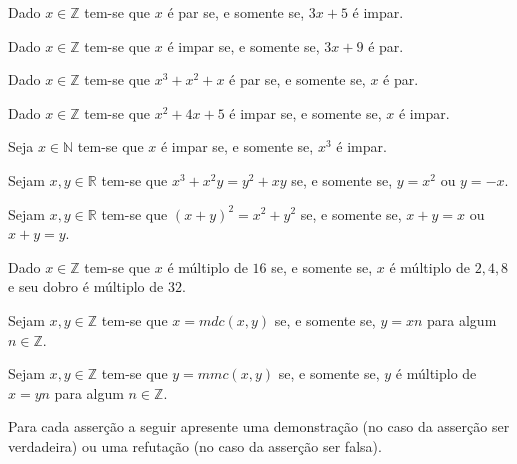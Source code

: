 \begin{exerList}
	\item Dado $x \in \mathbb{Z}$ tem-se que $x$ é par se, e somente se, $3x + 5$ é impar.
	\item Dado $x \in \mathbb{Z}$ tem-se que $x$ é impar se, e somente se, $3x + 9$ é par.
	\item Dado $x \in \mathbb{Z}$ tem-se que $x^3 + x^2 + x$ é par se, e somente se, $x$ é par.
	\item Dado $x \in \mathbb{Z}$ tem-se que $x^2 + 4x + 5$ é impar se, e somente se, $x$ é impar.
	\item Seja $x \in \mathbb{N}$ tem-se que $x$ é impar se, e somente se, $x^3$ é impar.
	\item Sejam $x, y \in \mathbb{R}$ tem-se que $x^3 + x^2y = y^2 + xy$ se, e somente se, $y = x^2$ ou $y = -x$.
	\item Sejam $x, y \in \mathbb{R}$ tem-se que $(x + y)^2 = x^2 + y^2$ se, e somente se, $x + y = x$ ou $x + y = y$.
	\item Dado $x \in \mathbb{Z}$ tem-se que $x$ é múltiplo de $16$ se, e somente se, $x$ é múltiplo de $2, 4, 8$ e seu dobro é múltiplo de $32$.
	\item Sejam $x, y \in \mathbb{Z}$ tem-se que $x = mdc(x, y)$ se, e somente se, $y = xn$ para algum $n \in \mathbb{Z}$.
	\item Sejam $x, y \in \mathbb{Z}$ tem-se que $y = mmc(x, y)$ se, e somente se, $y$ é múltiplo de $x = yn$ para algum $n \in \mathbb{Z}$.
\end{exerList}

\begin{questao}\label{test:Demosntracoes17}
	Para cada asserção a seguir apresente uma demonstração (no caso da asserção ser verdadeira) ou uma refutação (no caso da asserção ser falsa).
\end{questao}

